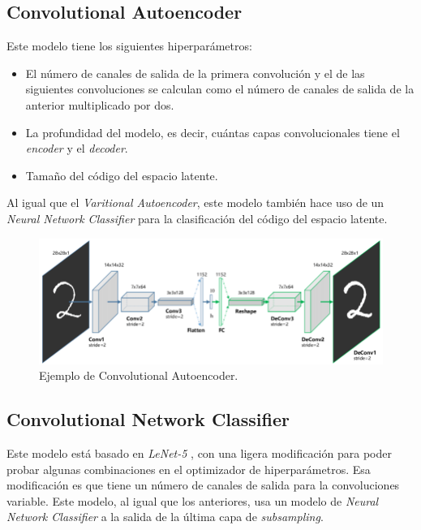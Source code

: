\subsection{Convolutional Autoencoder}

Este modelo tiene los siguientes hiperparámetros:

\begin{itemize}
	\item El número de canales de salida de la primera convolución y el de las siguientes convoluciones se calculan como el número de canales de salida de la anterior multiplicado por dos.
	\item La profundidad del modelo, es decir, cuántas capas convolucionales tiene el \textit{encoder} y el \textit{decoder}.
	\item Tamaño del código del espacio latente.
\end{itemize}

Al igual que el \textit{Varitional Autoencoder}, este modelo también hace uso de un \textit{Neural Network Classifier} para la clasificación del código del espacio latente.

\begin{figure}[H]
	\includegraphics[scale=0.3]{imagenes/05_Implementacion/CAE.png}
	\centering
	\caption{Ejemplo de Convolutional Autoencoder. \cite{cae}}
	\label{fig:cae}
\end{figure}

\subsection{Convolutional Network Classifier}

Este modelo está basado en \textit{LeNet-5} \cite{Lecun98gradient-basedlearning}, con una ligera modificación para poder probar algunas combinaciones en el optimizador de hiperparámetros. Esa modificación es que tiene un número de canales de salida para la convoluciones variable. Este modelo, al igual que los anteriores, usa un modelo de \textit{Neural Network Classifier} a la salida de la última capa de \textit{subsampling}.

